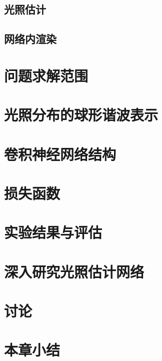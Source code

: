\subsection{光照估计}
\subsection{网络内渲染}
\section{问题求解范围}
\section{光照分布的球形谐波表示}
\section{卷积神经网络结构}
\section{损失函数}
\section{实验结果与评估}
\section{深入研究光照估计网络}
\section{讨论}
\section{本章小结}
